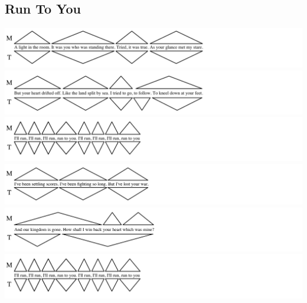 \normalsize
\fi






\subsection*{Run To You}

\includegraphics[width=\textwidth]{resources/trees/rty-s1-1.png}
\includegraphics[width=\textwidth]{resources/trees/rty-s1-2.png}
\includegraphics[width=\textwidth]{resources/trees/rty-r.png}
\includegraphics[width=\textwidth]{resources/trees/rty-s2-1.png}
\includegraphics[width=\textwidth]{resources/trees/rty-s2-2.png}
\includegraphics[width=\textwidth]{resources/trees/rty-r.png}
